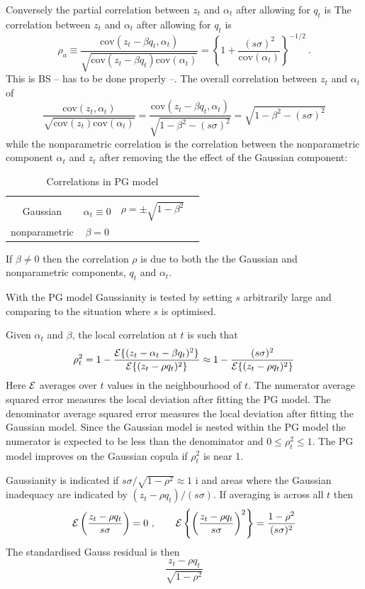 \documentclass[authoryear]{elsarticle}
\newcommand{\cov}{\mathrm{cov}}
\newcommand{\Ex}{{\cal E}}
\newcommand{\cq}{\ , \qquad}
\newcommand{\be}[1]{\begin{equation}\label{#1}}
\newcommand{\ee}{\end{equation}}
\begin{document}
Conversely the partial correlation between $z_t$ and $\alpha_t$ after allowing for $q_t$ is The  correlation between $z_t$ and $\alpha_t$ after allowing for $q_t$ is
\be{rho2}
\rho_a\equiv\frac{\cov(z_t-\beta q_t,\alpha_t)}{\sqrt{\cov(z_t-\beta q_t)\cov(\alpha_t)}} = \left\{1+\frac{(s\sigma)^2}{\cov(\alpha_t)}\right\}^{-1/2}\ .
\ee
This is BS -- has to be done properly --.  The  overall correlation between $z_t$ and $\alpha_t$ of
$$
\frac{\cov(z_t,\alpha_t)}{\sqrt{\cov(z_t)\cov(\alpha_t)}} = \frac{\cov(z_t-\beta q_t,\alpha_t)}{\sqrt{1-\beta^2-(s\sigma)^2}} =\sqrt{1-\beta^2-(s\sigma)^2}
$$
while the nonparametric correlation is the correlation between the nonparametric component $\alpha_t$ and  $z_t$ after removing the the effect of the Gaussian component:

\begin{table}[htdp]
\caption{Correlations in PG model}\label{default}
\begin{center}
\begin{tabular}{c|ccc}
&&\\
Gaussian& $\alpha_t\equiv 0$& $\rho=\pm\sqrt{1-\beta^2}$\\
nonparametric & $\beta=0$\\
\end{tabular}
\end{center}
\end{table}%
 

   If $\beta\ne 0$ then the correlation $\rho$ is due to both the the Gaussian and nonparametric components,  $q_t$ and $\alpha_t$.

With the PG model  Gaussianity is tested by setting $s$ arbitrarily large and comparing to the situation where $s$ is optimised.

Given $\alpha_t$ and $\beta$, the local  correlation at $t$ is such that
\be{rhot2}
\rho_t^2=1-\frac{\Ex\{(z_t-\alpha_t-\beta q_t)^2\}}{\Ex\{(z_t-\rho q_t)^2\}} \approx 1-\frac{(s\sigma)^2}{\Ex\{(z_t-\rho q_t)^2\}}
\ee
Here $\Ex$ averages over $t$ values in the neighbourhood of $t$.  The numerator average squared error measures the local deviation after fitting the PG model.  The denominator average squared error measures the local deviation after fitting the Gaussian model.   Since the Gaussian model is nested within the PG model the numerator is expected to be less than the denominator and $0\le\rho_t^2\le1$.   The PG model improves on the Gaussian copula if $\rho_t^2$ is near 1.

Gaussianity is indicated if $s\sigma/\sqrt{1-\rho^2}\approx 1$ i and areas where the Gaussian inadequacy are indicated by $(z_t-\rho q_t)/(s\sigma)$.  If averaging is across all $t$ then
$$
\Ex\left(\frac{z_t-\rho q_t}{s\sigma}\right) = 0\cq \Ex\left\{\left(\frac{z_t-\rho q_t}{s\sigma}\right)^2\right\} = \frac{1-\rho^2}{(s\sigma)^2}
$$
The standardised Gauss residual is then
$$
\frac{z_t-\rho q_t}{\sqrt{1-\rho^2}}
$$
\end{document}
